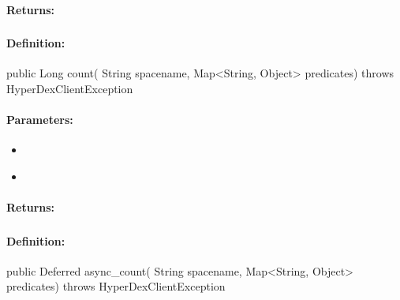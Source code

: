 \paragraph{Returns:}


\pagebreak
\subsubsection{}
\label{api:java:count}


\paragraph{Definition:}
\begin{javacode}
public Long count(
        String spacename,
        Map<String, Object> predicates) throws HyperDexClientException
\end{javacode}

\paragraph{Parameters:}
\begin{itemize}[noitemsep]
\item {}\\

\item {}\\

\end{itemize}

\paragraph{Returns:}


\pagebreak
\subsubsection{}
\label{api:java:async_count}


\paragraph{Definition:}
\begin{javacode}
public Deferred async_count(
        String spacename,
        Map<String, Object> predicates) throws HyperDexClientException
\end{javacode}

